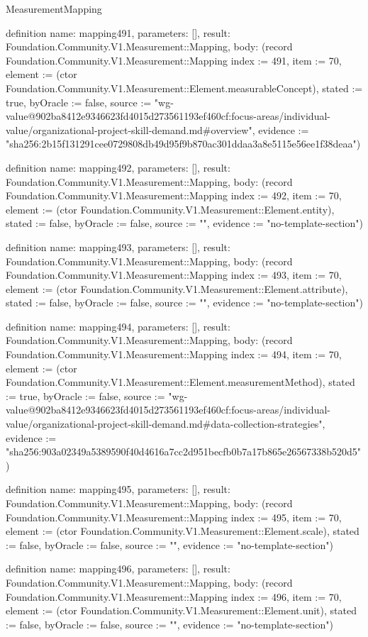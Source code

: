 \begin{lexlean}{MeasurementMapping}
\begin{semanticmodule}
definition{
  name: mapping491,
  parameters: [],
  result: Foundation.Community.V1.Measurement::Mapping,
  body: (record Foundation.Community.V1.Measurement::Mapping {index := 491, item := 70, element := (ctor Foundation.Community.V1.Measurement::Element.measurableConcept), stated := true, byOracle := false, source := "wg-value@902ba8412e9346623fd4015d273561193ef460cf:focus-areas/individual-value/organizational-project-skill-demand.md#overview", evidence := "sha256:2b15f131291cee0729808db49d95f9b870ac301ddaa3a8e5115e56ee1f38deaa"})
}

definition{
  name: mapping492,
  parameters: [],
  result: Foundation.Community.V1.Measurement::Mapping,
  body: (record Foundation.Community.V1.Measurement::Mapping {index := 492, item := 70, element := (ctor Foundation.Community.V1.Measurement::Element.entity), stated := false, byOracle := false, source := "", evidence := "no-template-section"})
}

definition{
  name: mapping493,
  parameters: [],
  result: Foundation.Community.V1.Measurement::Mapping,
  body: (record Foundation.Community.V1.Measurement::Mapping {index := 493, item := 70, element := (ctor Foundation.Community.V1.Measurement::Element.attribute), stated := false, byOracle := false, source := "", evidence := "no-template-section"})
}

definition{
  name: mapping494,
  parameters: [],
  result: Foundation.Community.V1.Measurement::Mapping,
  body: (record Foundation.Community.V1.Measurement::Mapping {index := 494, item := 70, element := (ctor Foundation.Community.V1.Measurement::Element.measurementMethod), stated := true, byOracle := false, source := "wg-value@902ba8412e9346623fd4015d273561193ef460cf:focus-areas/individual-value/organizational-project-skill-demand.md#data-collection-strategies", evidence := "sha256:903a02349a5389590f40d4616a7cc2d951becfb0b7a17b865e26567338b520d5"})
}

definition{
  name: mapping495,
  parameters: [],
  result: Foundation.Community.V1.Measurement::Mapping,
  body: (record Foundation.Community.V1.Measurement::Mapping {index := 495, item := 70, element := (ctor Foundation.Community.V1.Measurement::Element.scale), stated := false, byOracle := false, source := "", evidence := "no-template-section"})
}

definition{
  name: mapping496,
  parameters: [],
  result: Foundation.Community.V1.Measurement::Mapping,
  body: (record Foundation.Community.V1.Measurement::Mapping {index := 496, item := 70, element := (ctor Foundation.Community.V1.Measurement::Element.unit), stated := false, byOracle := false, source := "", evidence := "no-template-section"})
}


\end{semanticmodule}
\end{lexlean}
